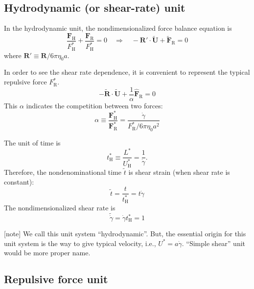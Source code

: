 \documentclass[fontsize=11pt]{scrartcl}
\begin{document}
\subsection*{Hydrodynamic (or shear-rate) unit}

In the hydrodynamic unit, the nondimensionalized
force balance equation is
\begin{equation}
 \frac{\bm{F}_{\mathrm{H}}}{F^{\ast}_{\mathrm{H}}}
  +
  \frac{\bm{F}_{\mathrm{R}}}{F^{\ast}_{\mathrm{H}}}  = 0
  \quad
  \Longrightarrow 
    \quad
 - \bm{R}' \cdot \tilde{\bm{U}} + \tilde{\bm{F}}_{\mathrm{R}} = 0
\end{equation}
where
$\bm{R}' \equiv \bm{R} / 6 \pi \eta_0 a $.

In order to see the shear rate dependence,
it is convenient to represent
the typical repulsive force $F_{\mathrm{R}}^{\ast}$.
%
\begin{equation}
 - \tilde{\bm{R}} \cdot \tilde{\bm{U}} +
\frac{1}{\alpha}  \hat{\bm{F}}_{\mathrm{R}} = 0
\end{equation}
%
This $\alpha$ indicates the competition between two forces:
\begin{equation}
 \alpha \equiv
\frac{\bm{F}_{\mathrm{H}}^{\ast}}{\bm{F}_{\mathrm{R}}^{\ast}}
=
  \frac{\dot{\gamma}}{F_{\mathrm{R}}^{\ast}/6\pi\eta_0 a^2}\label{102734_31May15}
\end{equation}


The unit of time is
\begin{equation}
 t_{\mathrm{H}}^{\ast} \equiv \frac{L^{\ast}}{U_{\mathrm{H}}^{\ast}}
  = \frac{1}{\dot{\gamma}}.
\end{equation}
Therefore, the nondenominational time $\tilde{t}$
is shear strain (when shear rate is constant):
\begin{equation} 
 \tilde{t} = \frac{t}{t_{\mathrm{H}}^{\ast}} = t \dot{\gamma}
\end{equation}
%
The nondimensionalized shear rate is
\begin{equation}
 \tilde{\dot{\gamma}}
  =
  \dot{\gamma} t_{\mathrm{H}}^{\ast} = 1
\end{equation}



[note]
We call this unit system ``hydrodynamic''.
But, the essential origin for this unit system
is the way to give typical velocity,
i.e., $U^{\ast} = a \dot{\gamma}$.
%
``Simple shear'' unit would be more proper name.


\subsection*{Repulsive force unit}
\end{document}
